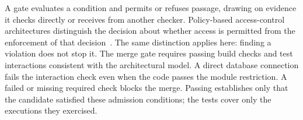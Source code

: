 




A gate evaluates a condition and permits or refuses passage, drawing on evidence it checks directly or receives from another checker. Policy-based access-control architectures distinguish the decision about whether access is permitted from the enforcement of that decision~\citep{rfc2753,oasis2017xacml}. The same distinction applies here: finding a violation does not stop it. The merge gate requires passing build checks and test interactions consistent with the architectural model. A direct database connection fails the interaction check even when the code passes the module restriction. A failed or missing required check blocks the merge. Passing establishes only that the candidate satisfied these admission conditions; the tests cover only the executions they exercised.




